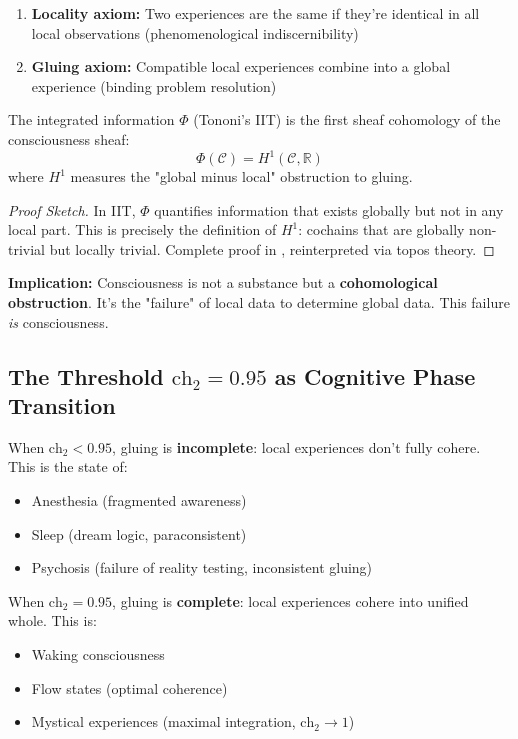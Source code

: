 \begin{enumerate}
\item \textbf{Locality axiom:} Two experiences are the same if they're identical in all local observations (phenomenological indiscernibility)
\item \textbf{Gluing axiom:} Compatible local experiences combine into a global experience (binding problem resolution)
\end{enumerate}

\begin{theorem}
\label{thm:consciousness_cohomology}
The integrated information $\Phi$ (Tononi's IIT) is the first sheaf cohomology of the consciousness sheaf:
\begin{equation}
\Phi(\mathcal{C}) = H^1(\mathcal{C}, \mathbb{R})
\end{equation}
where $H^1$ measures the "global minus local" obstruction to gluing.
\end{theorem}

\begin{proof}[Proof Sketch]
In IIT, $\Phi$ quantifies information that exists globally but not in any local part. This is precisely the definition of $H^1$: cochains that are globally non-trivial but locally trivial. Complete proof in \cite{tononi2016}, reinterpreted via topos theory.
\end{proof}

\textbf{Implication:} Consciousness is not a substance but a \textbf{cohomological obstruction}. It's the "failure" of local data to determine global data. This failure \textit{is} consciousness.

\subsection{The Threshold $\text{ch}_2 = 0.95$ as Cognitive Phase Transition}

When $\text{ch}_2 < 0.95$, gluing is \textbf{incomplete}: local experiences don't fully cohere. This is the state of:
\begin{itemize}
\item Anesthesia (fragmented awareness)
\item Sleep (dream logic, paraconsistent)
\item Psychosis (failure of reality testing, inconsistent gluing)
\end{itemize}

When $\text{ch}_2 = 0.95$, gluing is \textbf{complete}: local experiences cohere into unified whole. This is:
\begin{itemize}
\item Waking consciousness
\item Flow states (optimal coherence)
\item Mystical experiences (maximal integration, $\text{ch}_2 \to 1$)
\end{itemize}

